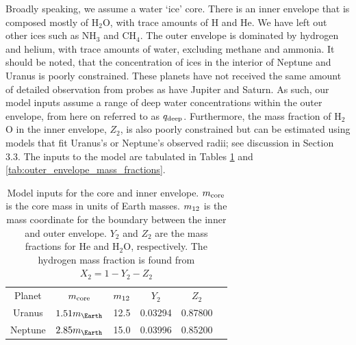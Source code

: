 \documentclass[11pt]{ucscthesisbs}
\begin{document}
Broadly speaking, we assume a water `ice' core. There is an inner envelope that is composed mostly of H$_{2}$O, with trace amounts of H and He. We have left out other ices such as NH$_{3}$ and CH$_{4}$. The outer envelope is dominated by hydrogen and helium, with trace amounts of water, excluding methane and ammonia. It should be noted, that the concentration of ices in the interior of Neptune and Uranus is poorly constrained. These planets have not received the same amount of detailed observation from probes as have Jupiter and Saturn. As such, our model inputs assume a range of deep water concentrations within the outer envelope, from here on referred to as $q_{\rm deep}$. Furthermore, the mass fraction of H$_{2}$O in the inner envelope, $Z_{2}$, is also poorly constrained but can be estimated using models that fit Uranus's or Neptune's observed radii; see discussion in Section 3.3. The inputs to the model are tabulated in Tables \ref{tab:core_mass_and_inner_envelope_mass_fractions} and \ref{tab:outer_envelope_mass_fractions}.
\begin{table}[h]
\centering
\begin{tabular}{cccccc}
                              &                                                  &                                   &                              &                               \\ \hline
\multicolumn{1}{|c|}{Planet}  & \multicolumn{1}{c|}{$m_{\rm core}$}              & \multicolumn{1}{c|}{$m_{\rm 12}$} & \multicolumn{1}{c|}{$Y_{2}$} & \multicolumn{1}{c|}{$Z_{2}$}  \\ \hline
\multicolumn{1}{|c|}{Uranus}  & \multicolumn{1}{c|}{$1.51 m_{\Earth}$}           & \multicolumn{1}{c|}{12.5}         & \multicolumn{1}{c|}{0.03294} & \multicolumn{1}{c|}{0.87800}  \\ \hline
\multicolumn{1}{|c|}{Neptune} & \multicolumn{1}{c|}{$2.85 m_{\Earth}$}           & \multicolumn{1}{c|}{15.0}         & \multicolumn{1}{c|}{0.03996} & \multicolumn{1}{c|}{0.85200}  \\ \hline
\end{tabular}
\caption{Model inputs for the core and inner envelope. $m_{\rm core}$ is the core mass in units of Earth masses. $m_{\rm 12}$ is the mass coordinate for the boundary between the inner and outer envelope. $Y_{2}$ and $Z_{2}$ are the mass fractions for He and H$_{2}$O, respectively. The hydrogen mass fraction is found from $X_{2} = 1 - Y_{2} - Z_{2}$}
\label{tab:core_mass_and_inner_envelope_mass_fractions}
\end{table}
\end{document}
